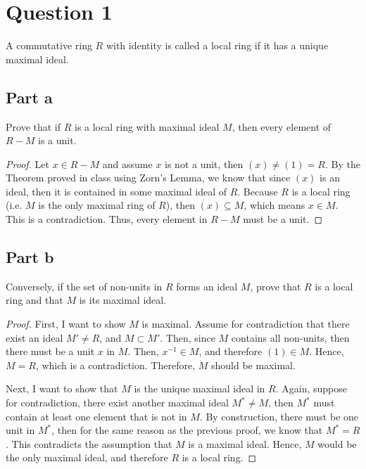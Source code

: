 \section{Question 1}

\begin{question}
    A commutative ring $R$ with identity is called a local ring if it has a unique maximal ideal.
\end{question}

\subsection{Part a}

\begin{question}
    Prove that if $R$ is a local ring with maximal ideal $M$, then every element of $R-M$ is a unit.
\end{question}

\begin{answer}
    \begin{proof}
        Let $x \in R-M$ and assume $x$ is not a unit, then $(x) \neq (1) = R$. By the Theorem proved in class using Zorn's Lemma, we know that since $(x)$ is an ideal, then it is contained in some maximal ideal of $R$. Because $R$ is a local ring (i.e. $M$ is the only maximal ring of $R$), then $(x) \subseteq M$, which means $x \in M$. This is a contradiction. Thus, every element in $R-M$ must be a unit.
    \end{proof}
\end{answer}

\subsection{Part b}

\begin{question}
    Conversely, if the set of non-units in $R$ forms an ideal $M$, prove that $R$ is a local ring and that $M$ is its maximal ideal.
\end{question}

\begin{answer}
    \begin{proof}
        First, I want to show $M$ is maximal. Assume for contradiction that there exist an ideal $M' \neq R$, and $M \subset M'$. Then, since $M$ contains all non-units, then there must be a unit $x$ in $M$. Then, $x^{-1} \in M$, and therefore $(1) \in M$. Hence, $M = R$, which is a contradiction. Therefore, $M$ should be maximal.
        
        Next, I want to show that $M$ is the unique maximal ideal in $R$. Again, suppose for contradiction, there exist another maximal ideal $M^* \neq M$, then $M^*$ must contain at least one element that is  not in $M$. By construction, there must be one unit in $M^*$, then for the same reason as the previous proof, we know that $M^* = R$. This contradicts the assumption that $M$ is a maximal ideal. Hence, $M$ would be the only maximal ideal, and therefore $R$ is a local ring.
    \end{proof}
\end{answer}

